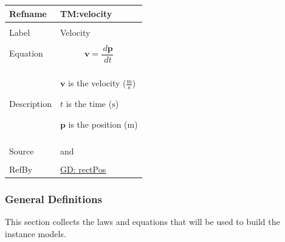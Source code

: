 \documentclass[12pt]{article}
\begin{document}
\begin{minipage}{\textwidth}
\begin{tabular}{>{\raggedright}p{}>{\raggedright\arraybackslash}p{}}
\toprule \textbf{Refname} & \textbf{TM:velocity}
\label{TM:velocity}
\\ \midrule \\
Label & Velocity
        
\\ \midrule \\
Equation & \begin{displaymath}
           \mathbf{v}=\frac{\,d\mathbf{p}}{\,dt}
           \end{displaymath}
\\ \midrule \\
Description & \begin{symbDescription}
              \item{$\mathbf{v}$ is the velocity ($\frac{\text{m}}{\text{s}}$)}
              \item{$t$ is the time (${\text{s}}$)}
              \item{$\mathbf{p}$ is the position (${\text{m}}$)}
              \end{symbDescription}
\\ \midrule \\
Source & \cite{velocityWiki} and \cite[(pg. 6)]{hibbeler2004}
         
\\ \midrule \\
RefBy & \hyperref[GD:rectPos]{GD: rectPos}
        
\\ \bottomrule
\end{tabular}
\end{minipage}
\subsubsection{General Definitions}
\label{Sec:GDs}
This section collects the laws and equations that will be used to build the instance models.
\end{document}
